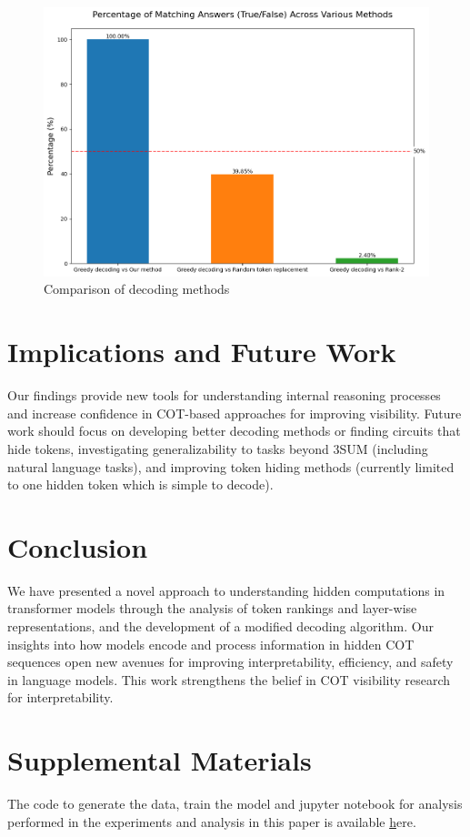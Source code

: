 \documentclass{article}
\begin{document}
\begin{figure}[H]
\centering
\includegraphics[width=\textwidth]{token_comparison_percentages.png}
\caption{Comparison of decoding methods}
\label{fig:decoding_comparison}
\end{figure}

\section{Implications and Future Work}
Our findings provide new tools for understanding internal reasoning processes and increase confidence in COT-based approaches for improving visibility. Future work should focus on developing better decoding methods or finding circuits that hide tokens, investigating generalizability to tasks beyond 3SUM (including natural language tasks), and improving token hiding methods (currently limited to one hidden token which is simple to decode).

\section{Conclusion}
We have presented a novel approach to understanding hidden computations in transformer models through the analysis of token rankings and layer-wise representations, and the development of a modified decoding algorithm. Our insights into how models encode and process information in hidden COT sequences open new avenues for improving interpretability, efficiency, and safety in language models. This work strengthens the belief in COT visibility research for interpretability.

\section*{Supplemental Materials}
The code to generate the data, train the model and jupyter notebook for analysis performed in the experiments and analysis in this paper is available \href{https://drive.google.com/file/d/1E5ADI6Nc8fm7RQLzV1NkF2YJY1KsngMf/view} here.
\end{document}
